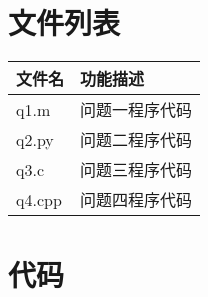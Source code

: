 \documentclass[withoutpreface,bwprint]{cumcmthesis}
\begin{document}
\newpage
\begin{appendices}
\section{文件列表}
\begin{table}[H]
\centering
\begin{tabularx}{\textwidth}{LL}
\toprule
文件名   & 功能描述 \\
\midrule
q1.m & 问题一程序代码 \\
q2.py & 问题二程序代码 \\
q3.c & 问题三程序代码 \\
q4.cpp & 问题四程序代码 \\
\bottomrule
\end{tabularx}
\label{tab:文件列表}
\end{table}

\section{代码}

\end{appendices}
\end{document}
